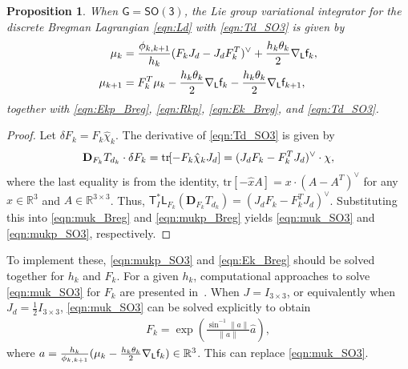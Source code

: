 \documentclass[letterpaper, 10pt, conference]{ieeeconf}
\newcommand{\bracket}[1]{\ensuremath{\left[ #1 \right]}}
\newcommand{\tr}[1]{\mbox{tr}\ensuremath{\negthickspace\bracket{#1}}}
\newcommand{\G}{\ensuremath{\mathsf{G}}}
\newcommand{\SO}{\ensuremath{\mathsf{SO(3)}}}
\newcommand{\T}{\ensuremath{\mathsf{T}}}
\renewcommand{\L}{\ensuremath{\mathsf{L}}}
\renewcommand{\Re}{\ensuremath{\mathbb{R}}}
\newcommand{\D}{\ensuremath{\mathbf{D}}}
\newtheorem{prop}{Proposition}
\begin{document}
\begin{prop}\label{prop:DEL_Breg_SO3}
    When $\G=\SO$, the Lie group variational integrator for the discrete Bregman Lagrangian \eqref{eqn:Ld} with \eqref{eqn:Td_SO3} is given by
\begin{align}
    \mu_k & =\frac{\phi_{k,k+1}}{h_k } (F_k J_d - J_dF_k^T)^\vee + \frac{h_k\theta_k }{2} \nabla_\L \obj_k, \label{eqn:muk_SO3} \\
    \mu_{k+1}  & = F_k^T \mu_k -\frac{h_k\theta_k}{2}\nabla_\L \obj_k - \frac{h_k\theta_k}{2} \nabla_\L \obj_{k+1}, \label{eqn:mukp_SO3}
\end{align}
together with \eqref{eqn:Ekp_Breg}, \eqref{eqn:Rkp}, \eqref{eqn:Ek_Breg},  and \eqref{eqn:Td_SO3}.
\end{prop}
\begin{proof}
    Let $\delta F_k = F_k \hat\chi_k$.
    The derivative of \eqref{eqn:Td_SO3} is given by
    \begin{align*}
        \D_{F_k} T_{d_k} \cdot \delta F_k = \tr{-F_k\hat\chi_k J_d} = (J_dF_k - F_k^T J_d)^\vee \cdot \chi,
    \end{align*}
    where the last equality is from the identity, $\mathrm{tr}[-\hat x A]= x\cdot (A-A^T)^\vee$ for any $x\in\Re^3$ and $A\in\Re^{3\times 3}$.
    Thus, $\T^*_I \L_{F_k} (\D_{F_k} T_{d_k}) = (J_dF_k - F_k^T J_d)^\vee $. 
    Substituting this into \eqref{eqn:muk_Breg} and \eqref{eqn:mukp_Breg} yields \eqref{eqn:muk_SO3} and \eqref{eqn:mukp_SO3}, respectively. 
\end{proof}
To implement these, \eqref{eqn:mukp_SO3} and \eqref{eqn:Ek_Breg} should be solved together for $h_k$ and $F_k$.
For a given $h_k$, computational approaches to solve \eqref{eqn:muk_SO3} for $F_k$ are presented in~\cite[Sec 3.3.8]{Lee08}.
When $J=I_{3\times 3}$, or equivalently when $J_d = \frac{1}{2}I_{3\times 3}$, \eqref{eqn:muk_SO3} can be solved explicitly to obtain
\begin{align}
    F_k = \exp \left(\frac{\sin^{-1}\|a\|}{\|a\|}\hat a\right),\label{eqn:Fk_SO3}
\end{align}
where $a = \frac{h_k}{\phi_{k,k+1}} (\mu_k - \frac{h_k\theta_k}{2}\nabla_\L \obj_k)\in\Re^3$.
This can replace \eqref{eqn:muk_SO3}.
\end{document}
